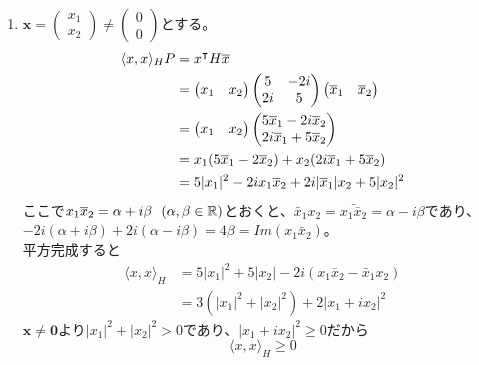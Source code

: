 \documentclass[dvipdfmx]{jsreport}
\begin{document}
\begin{souanswer}
\begin{enumerate}
\begin{itemize}
\begin{equation*}
    P= \begin{pmatrix}\bm{p}_1 \bm{p}_2\end{pmatrix}= \frac{1}{\sqrt{2}}\begin{pmatrix}-i& i\\ 1& 1\end{pmatrix}
\end{equation*}
    このとき$P$はユニタリ行列であり、
\begin{equation*}
    D= P^{-1}HP= \begin{pmatrix}7& 0\\ 0& 3\end{pmatrix}
\end{equation*}
    となる。
\end{itemize}
    \item $\bm{x}= \begin{pmatrix}x_1\\ x_2\end{pmatrix}\ne \begin{pmatrix}0\\ 0\end{pmatrix}$とする。
\begin{align*}
    \langle{x, x}\rangle_HP
    &= {x}^\intercal H\overline{x}\\
    &= \begin{pmatrix}x_1& x_2\end{pmatrix}\begin{pmatrix}5& -2i\\ 2i& 5\end{pmatrix}\begin{pmatrix}\overline{x}_1& \overline{x}_2\end{pmatrix}\\
    &= \begin{pmatrix}x_1& x_2\end{pmatrix}\begin{pmatrix}5\overline{x}_1- 2i\overline{x}_2\\ 2i\overline{x}_1+ 5\overline{x}_2\end{pmatrix}\\
    &= x_1(5\overline{x}_1- 2\overline{x}_2)+ x_2(2i\overline{x}_1+ 5\overline{x}_2)\\
    &= 5|x_1|^2- 2ix_1\overline{x}_2+ 2i|\overline{x}_1|x_2+ 5|x_2|^2
\end{align*}
    ここで$x_1\overline{x}_2= \alpha+ i\beta\ \ (\alpha, \beta\in \mathbb{R})$とおくと、$\bar{x}_1x_2= \bar{x_1\bar{x}_2}= \alpha- i\beta$であり、$-2i(\alpha+ i\beta)+ 2i(\alpha- i\beta)= 4\beta= Im(x_1\bar{x}_2)$。\\
    平方完成すると
\begin{align*}
    \langle{x, x}\rangle_H
    &= 5|x_1|^2+ 5|x_2|- 2i(x_1\bar{x}_2- \bar{x}_1x_2)\\
    &= 3(|x_1|^2+ |x_2|^2)+ 2|x_1+ ix_2|^2
\end{align*}
    $\bm{x}\ne \bm{0}$より$|x_1|^2+ |x_2|^2> 0$であり、$|x_1+ ix_2|^2\ge 0$だから
\begin{equation*}
    \langle{x, x}\rangle_H\ge 0
\end{equation*}
\end{enumerate}
\end{souanswer}
\end{document}
